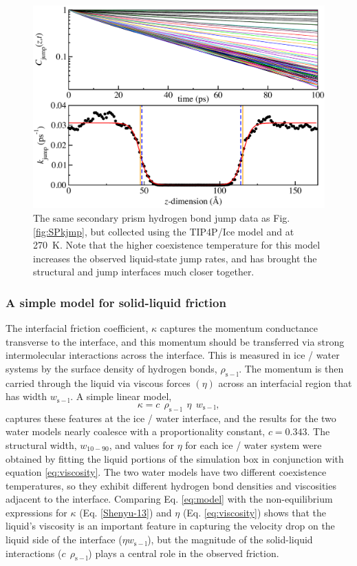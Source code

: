 \begin{figure}
\includegraphics[width=\linewidth]{Figures/secprismJumpPlotTIP4PIce}
\caption{\label{fig:SPTIP4Pkjmp} The same secondary prism hydrogen
  bond jump data as Fig. \ref{fig:SPkjmp}, but collected using the
  TIP4P/Ice model and at 270~K.  Note that the higher coexistence
  temperature for this model increases the observed liquid-state jump
  rates, and has brought the structural and jump interfaces much
  closer together.}
\end{figure}

\subsubsection{A simple model for solid-liquid friction}
The interfacial friction coefficient, $\kappa$ captures the momentum
conductance transverse to the interface, and this momentum should be
transferred via strong intermolecular interactions across the
interface. This is measured in ice / water systems by the surface
density of hydrogen bonds, $\rho_\mathrm{s-l}$.  The momentum is then
carried through the liquid via viscous forces $(\eta)$ across an
interfacial region that has width $w_\mathrm{s-l}$. A simple linear
model,
\begin{equation}
  \kappa = c~~\rho_\mathrm{s-l}~~\eta~~w_\mathrm{s-l},
\label{eq:model}
\end{equation}
captures these features at the ice / water interface, and the results
for the two water models nearly coalesce with a proportionality
constant, $c = 0.343$.  The structural width, $w_\mathrm{10-90}$, and
values for $\eta$ for each ice / water system were obtained by fitting
the liquid portions of the simulation box in conjunction with equation
\eqref{eq:viscosity}.  The two water models have two different
coexistence temperatures, so they exhibit different hydrogen bond
densities and viscosities adjacent to the interface.  Comparing
Eq. \eqref{eq:model} with the non-equilibrium expressions for $\kappa$
(Eq. \eqref{Shenyu-13}) and $\eta$ (Eq. \eqref{eq:viscosity}) shows
that the liquid's viscosity is an important feature in capturing the
velocity drop on the liquid side of the interface
($\eta w_\mathrm{s-l}$), but the magnitude of the solid-liquid
interactions ($c~~\rho_\mathrm{s-l}$) plays a central role in the
observed friction.

